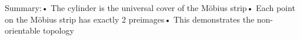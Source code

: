 \documentclass[preview]{standalone}
\begin{document}
\begin{center}
Summary:• The cylinder is the universal cover of the Möbius strip• Each point on the Möbius strip has exactly 2 preimages• This demonstrates the non-orientable topology
\end{center}
\end{document}
